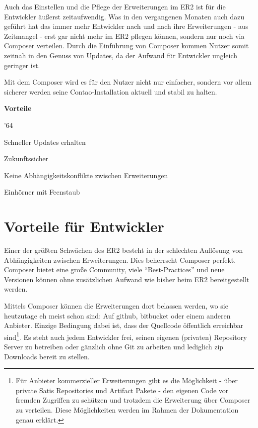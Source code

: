 \documentclass[
paper=a4,
draft=false,%
fontsize=10pt%
]{scrartcl}
\begin{document}
Auch das Einstellen und die Pflege der Erweiterungen im ER2 ist für die Entwickler äußerst zeitaufwendig. Was in den vergangenen Monaten auch dazu geführt hat das immer mehr Entwickler nach und nach ihre Erweiterungen - aus Zeitmangel - erst gar nicht mehr im ER2 pflegen können, sondern nur noch via Composer verteilen. Durch die Einführung von Composer kommen Nutzer somit zeitnah in den Genuss von Updates, da der Aufwand für Entwickler ungleich geringer ist.

Mit dem Composer wird es für den Nutzer nicht nur einfacher, sondern vor allem sicherer werden seine Contao-Installation aktuell und stabil zu halten.

\textbf{Vorteile}
\begin{dinglist}{'64}
\item Schneller Updates erhalten
\item Zukunftssicher
\item Keine Abhängigkeitskonflikte zwischen Erweiterungen
\item Einhörner mit Feenstaub
\end{dinglist}

\newpage

%
%

\newpage

\section{Vorteile für Entwickler}
\label{sec:pros-for-developers}

Einer der größten Schwächen des ER2 besteht in der schlechten Auflösung von Abhängigkeiten zwischen Erweiterungen. Dies beherrscht Composer perfekt. Composer bietet eine große Community, viele “Best-Practices” und neue Versionen können ohne zusätzlichen Aufwand wie bisher beim ER2 bereitgestellt werden.

Mittels Composer können die Erweiterungen dort belassen werden, wo sie heutzutage eh meist schon sind: Auf github, bitbucket oder einem anderen Anbieter. Einzige Bedingung dabei ist, dass der Quellcode öffentlich erreichbar sind\footnote{Für Anbieter kommerzieller Erweiterungen gibt es die Möglichkeit - über private Satis Repositories und Artifact Pakete - den eigenen Code vor fremden Zugriffen zu schützen und trotzdem die Erweiterung über Composer zu verteilen. Diese Möglichkeiten werden im Rahmen der Dokumentation genau erklärt.}.
Es steht auch jedem Entwickler frei, seinen eigenen (privaten) Repository Server zu betreiben oder gänzlich ohne Git zu arbeiten und lediglich zip Downloads bereit zu stellen.
\end{document}
